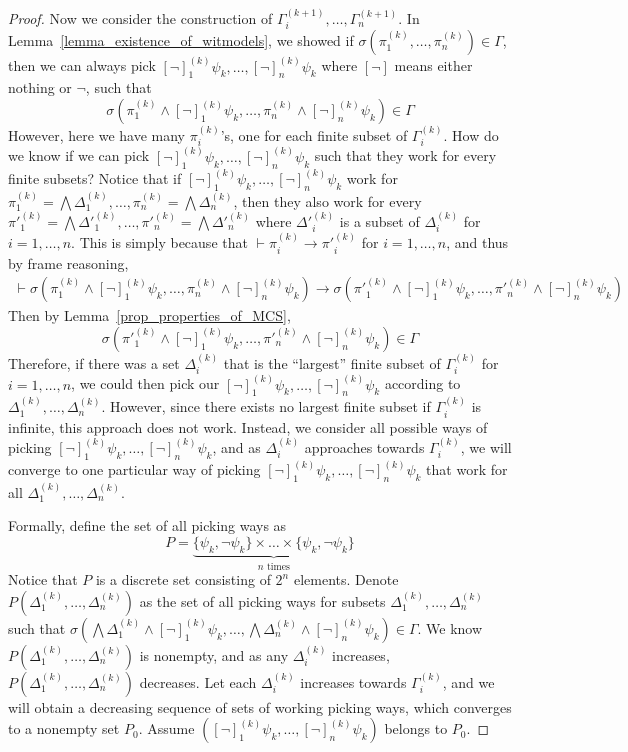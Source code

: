 \documentclass[acmsmall]{acmart}
\theoremstyle{acmdefinition}
\newcommand{\imp}{\to}
\newcommand{\Gammai}[1]{\Gamma_i^{(#1)}}
\newcommand{\Deltai}[1]{\Delta_i^{(#1)}}
\newcommand{\pii}[1]{\pi_i^{(#1)}}
\newcommand{\ddd}{,\dots,}
\begin{document}
\begin{proof}
Now we consider the construction of
$\Gamma_i^{(k+1)} \ddd \Gamma_n^{(k+1)}$.
In Lemma~\ref{lemma_existence_of_witmodels}, we showed 
if $\sigma(\pi_1^{(k)} \ddd \pi_n^{(k)}) \in \Gamma$,
then we can always pick
$[\neg]_1^{(k)} \psi_k \ddd [\neg]_n^{(k)} \psi_k$
where $[\neg]$ means either nothing or $\neg$,
such that
$$
\sigma(
  \pi_1^{(k)} \wedge [\neg]_1^{(k)} \psi_k \ddd
  \pi_n^{(k)} \wedge [\neg]_n^{(k)} \psi_k
)
\in \Gamma
$$
However, here we have many $\pii{k}$'s, one for each finite subset of 
$\Gammai{k}$.
How do we know if we can pick 
$[\neg]_1^{(k)} \psi_k \ddd [\neg]_n^{(k)} \psi_k$
such that they work for every finite subsets?
Notice that if $[\neg]_1^{(k)} \psi_k \ddd [\neg]_n^{(k)} \psi_k$
work for 
$
\pi_1^{(k)} = \bigwedge \Delta_1^{(k)} 
\ddd 
\pi_n^{(k)} = \bigwedge \Delta_n^{(k)} 
$,
then they also work for
every
$
{\pi'}_1^{(k)} = \bigwedge {\Delta'}_1^{(k)} 
\ddd 
{\pi'}_n^{(k)} = \bigwedge {\Delta'}_n^{(k)} 
$
where 
${\Delta'}_i^{(k)}$ is a subset of $\Delta_i^{(k)}$ for $i = 1 \ddd n$.
This is simply because that
$\vdash \pi_i^{(k)} \imp {\pi'}_i^{(k)}$ for $i = 1 \ddd n$,
and thus by frame reasoning,
\begin{align*}
\vdash
\sigma(
  \pi_1^{(k)} \wedge [\neg]_1^{(k)} \psi_k \ddd
  \pi_n^{(k)} \wedge [\neg]_n^{(k)} \psi_k
)
\imp
\sigma(
  {\pi'}_1^{(k)} \wedge [\neg]_1^{(k)} \psi_k \ddd
  {\pi'}_n^{(k)} \wedge [\neg]_n^{(k)} \psi_k
)
\end{align*}
Then by Lemma~\ref{prop_properties_of_MCS},
$$
\sigma(
  {\pi'}_1^{(k)} \wedge [\neg]_1^{(k)} \psi_k \ddd
  {\pi'}_n^{(k)} \wedge [\neg]_n^{(k)} \psi_k
)
\in \Gamma
$$
Therefore, if there was a set $\Deltai{k}$
that is the ``largest'' finite subset of $\Gammai{k}$
for $i = 1 \ddd n$,
we could then pick our
$[\neg]_1^{(k)} \psi_k \ddd [\neg]_n^{(k)} \psi_k$
according to
$\Delta_1^{(k)} \ddd \Delta_n^{(k)}$.
However, since there exists no largest finite subset
if $\Gammai{k}$ is infinite,
this approach does not work.
Instead, we consider all possible ways of picking
$[\neg]_1^{(k)} \psi_k \ddd [\neg]_n^{(k)} \psi_k$,
and as $\Delta_i^{(k)}$ approaches towards $\Gammai{k}$,
we will converge to one particular way of picking
$[\neg]_1^{(k)} \psi_k \ddd [\neg]_n^{(k)} \psi_k$
that work for all
$\Delta_1^{(k)} \ddd \Delta_n^{(k)}$.

Formally, define the set of all picking ways as
$$
P = \underbrace{
	\{ \psi_k , \neg \psi_k \} \times \dots \times
    \{ \psi_k , \neg \psi_k \}
    }_\text{
    $n$ times
    }
$$
Notice that $P$ is a discrete set consisting of $2^n$ elements.
Denote $P(\Delta_1^{(k)} \ddd \Delta_n^{(k)})$
as the set of all picking ways
for subsets $\Delta_1^{(k)} \ddd \Delta_n^{(k)}$
such that
$
\sigma(\bigwedge \Delta_1^{(k)} \wedge [\neg]_1^{(k)} \psi_k
  \ddd \bigwedge \Delta_n^{(k)} \wedge [\neg]_n^{(k)} \psi_k) \in \Gamma
$.
We know $P(\Delta_1^{(k)} \ddd \Delta_n^{(k)})$ is nonempty,
and as any $\Delta_i^{(k)}$ increases,
$P(\Delta_1^{(k)} \ddd \Delta_n^{(k)})$ decreases.
Let each $\Delta_i^{(k)}$ increases towards $\Gamma_i^{(k)}$,
and we will obtain a decreasing sequence of
sets of working picking ways,
which converges to a nonempty set $P_0$.
Assume 
$([\neg]_1^{(k)} \psi_k \ddd [\neg]_n^{(k)} \psi_k)$ belongs to $P_0$.


\end{proof}
\end{document}
